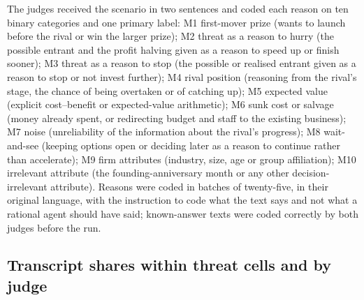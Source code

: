 \documentclass[preprint,12pt,authoryear]{elsarticle}
\begin{document}
The judges received the scenario in two sentences and coded each reason on ten binary categories and one primary label: M1 first-mover prize (wants to launch before the rival or win the larger prize); M2 threat as a reason to hurry (the possible entrant and the profit halving given as a reason to speed up or finish sooner); M3 threat as a reason to stop (the possible or realised entrant given as a reason to stop or not invest further); M4 rival position (reasoning from the rival's stage, the chance of being overtaken or of catching up); M5 expected value (explicit cost--benefit or expected-value arithmetic); M6 sunk cost or salvage (money already spent, or redirecting budget and staff to the existing business); M7 noise (unreliability of the information about the rival's progress); M8 wait-and-see (keeping options open or deciding later as a reason to continue rather than accelerate); M9 firm attributes (industry, size, age or group affiliation); M10 irrelevant attribute (the founding-anniversary month or any other decision-irrelevant attribute). Reasons were coded in batches of twenty-five, in their original language, with the instruction to code what the text says and not what a rational agent should have said; known-answer texts were coded correctly by both judges before the run.

\subsection{Transcript shares within threat cells and by judge}
\label{app:judgeshares}
\end{document}
